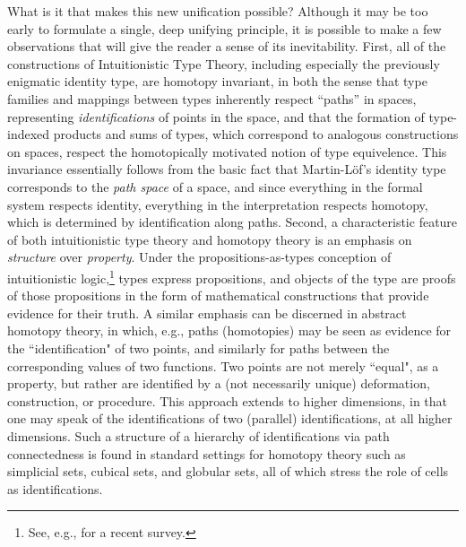 \documentclass[11pt]{article}
\theoremstyle{remark}
\theoremstyle{definition}
\begin{document}
What is it that makes this new unification possible?  Although it may be too early to formulate a single, deep
unifying principle, it is possible to make a few observations that will give the reader a sense of its inevitability.
First, all of the constructions of Intuitionistic Type Theory, including especially the previously enigmatic identity
type, are homotopy invariant, in both the  sense that type families and mappings between types inherently respect
``paths'' in spaces, representing \emph{identifications} of points in the space, and that the formation of type-indexed
products and sums of types, which correspond to analogous constructions on spaces, respect the homotopically motivated
notion of type equivelence.  This invariance essentially follows from the basic fact that Martin-L\"{o}f's identity
type corresponds to the \emph{path space} of a space, and since everything in the formal system respects identity, 
everything in the interpretation respects homotopy, which is determined by identification along paths.  Second, a characteristic feature of both intuitionistic type theory and homotopy theory is an emphasis on \emph{structure} over \emph{property}.  Under the propositions-as-types conception of intuitionistic logic,\footnote{See, e.g., \cite{PAT} for a recent survey.} types express propositions, and objects of the type are proofs of those propositions in the form of mathematical constructions that provide evidence for their truth.  A similar emphasis can be discerned  in abstract homotopy
theory, in which, e.g., paths (homotopies) may be seen as evidence for the ``identification" of two
points, and similarly for paths between the corresponding values of two functions.  Two points are not merely ``equal", as a
property, but rather are identified by a (not necessarily unique) deformation, construction, or procedure.  This approach extends to higher
dimensions, in that one may speak of the identifications of two (parallel) identifications, at all higher dimensions.
Such a structure of a hierarchy of identifications via path connectedness is found in standard settings for homotopy
theory such as simplicial sets, cubical sets, and globular sets, all of which stress the role of cells as
identifications.
\end{document}
